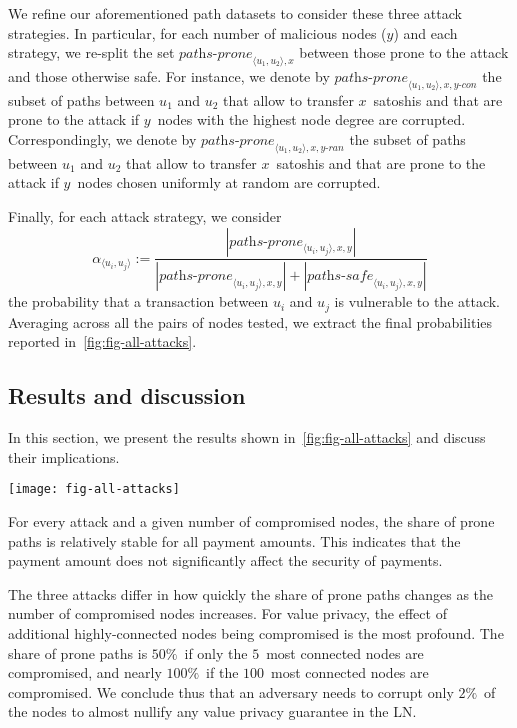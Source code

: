 We refine our aforementioned path datasets to consider these three attack strategies.
In particular, for each number of malicious nodes ($y$) and each strategy, we re-split the set $\textit{paths-prone}_{\langle u_1, u_2 \rangle, x}$ between those prone to the attack and those otherwise safe.
For instance, we denote by $\textit{paths-prone}_{\langle u_1, u_2 \rangle, x, y\textit{-con}}$ the subset of paths between $u_1$ and $u_2$ that allow to transfer $x$~satoshis and that are prone to the attack if $y$~nodes with the highest node degree are corrupted.
Correspondingly, we denote by $\textit{paths-prone}_{\langle u_1, u_2 \rangle, x, y\textit{-ran}}$ the subset of paths between $u_1$ and $u_2$ that allow to transfer $x$~satoshis and that are prone to the attack if $y$~nodes chosen uniformly at random are corrupted.

Finally, for each attack strategy, we consider $$\alpha_{\langle u_i, u_j \rangle} := \frac{|\textit{paths-prone}_{\langle u_i, u_j \rangle, x, y}|}{|\textit{paths-prone}_{\langle u_i, u_j \rangle, x, y}| + |\textit{paths-safe}_{\langle u_i, u_j \rangle, x, y}|}$$ the probability that a transaction between $u_i$ and $u_j$ is vulnerable to the attack.
Averaging across all the pairs of nodes tested, we extract the final probabilities reported in~\cref{fig:fig-all-attacks}.


\subsection{Results and discussion}

In this section, we present the results shown in~\cref{fig:fig-all-attacks} and discuss their implications.
\begin{figure*}
	\centering
	\texttt{[image: fig-all-attacks]}
	\caption{Share of vulnerable paths for each attack, considering that the highest degree nodes are compromised (top), the highest capacity nodes are compromised (middle), or random nodes are compromised (bottom).}
	\label{fig:fig-all-attacks}
\end{figure*}

For every attack and a given number of compromised nodes, the share of prone paths is relatively stable for all payment amounts.
This indicates that the payment amount does not significantly affect the security of payments.

The three attacks differ in how quickly the share of prone paths changes as the number of compromised nodes increases.
For value privacy, the effect of additional highly-connected nodes being compromised is the most profound.
The share of prone paths is $50\%$~if only the $5$~most connected nodes are compromised, and nearly $100\%$~if the $100$~most connected nodes are compromised.
We conclude thus that an adversary needs to corrupt only $2\%$~of the nodes to almost nullify any value privacy guarantee in the LN\@.

